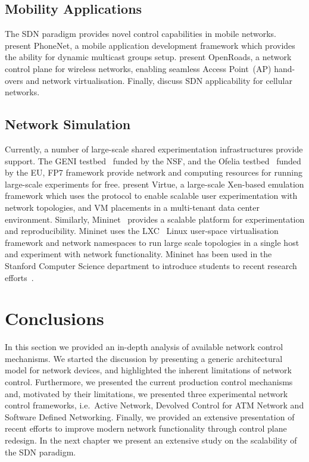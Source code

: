 \subsection{Mobility Applications}

The SDN paradigm provides novel control capabilities in mobile networks.
 present PhoneNet, a mobile application development framework
which provides the ability for dynamic multicast groups setup.
 present OpenRoads, a network control plane for wireless
networks, enabling seamless Access Point~(AP) hand-overs and network
virtualisation.  Finally,  discuss SDN applicability for
cellular networks.

\subsection{Network Simulation}

Currently, a number of large-scale shared experimentation infrastructures provide
\of support. The GENI testbed~ funded by the NSF, and the Ofelia
testbed~ funded by the EU, FP7 framework provide network and
computing resources for running large-scale experiments for free.  
present Virtue, a large-scale Xen-based emulation framework which uses the \of
protocol to enable scalable user experimentation with network topologies, and VM
placements in a multi-tenant data center environment. Similarly,
Mininet~  provides a scalable platform  for \of
experimentation and reproducibility. Mininet uses the LXC~ Linux
user-space virtualisation framework and network namespaces to run large scale
topologies in a single host and experiment with network functionality.  Mininet
has been used in the Stanford Computer Science department to introduce students
to recent research efforts~. 

\section{Conclusions}

In this section we provided an in-depth analysis of available network control
mechanisms.  We started the discussion by presenting a generic architectural
model for network devices, and highlighted the inherent limitations of network
control. Furthermore, we presented the current production  control mechanisms
and, motivated by their limitations, we presented three experimental network
control frameworks, i.e.~Active Network, Devolved Control for ATM Network and
Software Defined Networking. Finally, we provided an extensive presentation of
recent efforts to improve modern network functionality through control plane
redesign. In the next chapter we present an extensive study on the scalability
of the SDN paradigm. 
